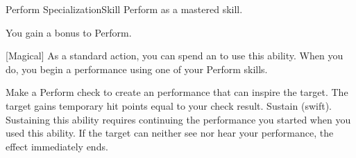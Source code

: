     \begin{feat}{Perform Specialization}{Skill}
        \featpre Perform as a mastered skill.
        \featben

         You gain a  bonus to Perform.

        [Magical] As a standard action, you can spend an  to use this ability.
        When you do, you begin a performance using one of your Perform skills.
        \begin{ability}
            \begin{spelltargetinginfo}
            \end{spelltargetinginfo}
            \begin{spelleffects}
                \spelleffect Make a Perform check to create an performance that can inspire the target.
                The target gains temporary hit points equal to your check result.
                \spelldur Sustain (swift). Sustaining this ability requires continuing the performance you started when you used this ability. If the target can neither see nor hear your performance, the effect immediately ends.
            \end{spelleffects}
        \end{ability}


\end{feat}
